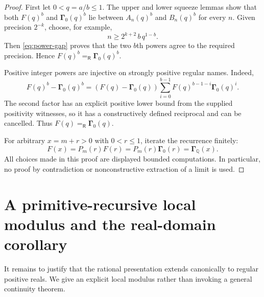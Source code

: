 \documentclass[11pt]{article}
\newcommand{\Q}{\mathbb Q}
\newcommand{\Gam}{\boldsymbol\Gamma}
\newcommand{\Eq}{\mathrel{=_{\!\mathsf R}}}
\begin{document}
\begin{proof}
First let $0<q=a/b\le1$.  The upper and lower squeeze lemmas show that both
$F(q)^b$ and $\Gam_0(q)^b$ lie between $A_n(q)^b$ and $B_n(q)^b$ for every
$n$.  Given precision $2^{-k}$, choose, for example,
\[
 n\ge 2^{k+2}\,b\,q^{1-b}.
 \label{eq:explicit-n-unique}
\]
Then \eqref{eq:power-gap} proves that the two $b$th powers agree to the
required precision.  Hence
$F(q)^b\Eq\Gam_0(q)^b$.

Positive integer powers are injective on strongly positive regular names.
Indeed,
\[
 F(q)^b-\Gam_0(q)^b
 =(F(q)-\Gam_0(q))
 \sum_{i=0}^{b-1}F(q)^{b-1-i}\Gam_0(q)^i.
\]
The second factor has an explicit positive lower bound from the supplied
positivity witnesses, so it has a constructively defined reciprocal and can
be cancelled.  Thus $F(q)\Eq\Gam_0(q)$.

For arbitrary $x=m+r>0$ with $0<r\le1$, iterate the recurrence finitely:
\[
 F(x)=P_m(r)F(r)=P_m(r)\Gam_0(r)=\Gam_{\Q}(x).
\]
All choices made in this proof are displayed bounded computations.  In
particular, no proof by contradiction or nonconstructive extraction of a
limit is used.
\end{proof}

\section{A primitive-recursive local modulus and the real-domain corollary}
\label{sec:completion}

It remains to justify that the rational presentation extends canonically to
regular positive reals.  We give an explicit local modulus rather than
invoking a general continuity theorem.
\end{document}
